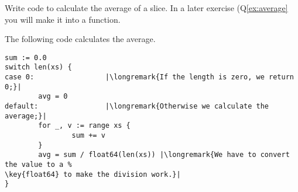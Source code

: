 \begin{Exercise}[title={Average},difficulty=1]
\label{ex:average no func}
\Question\label{ex:average no func q1} Write code
to calculate the average of a  slice. In
a later exercise (Q\ref{ex:average} you will make it into
a function.
\end{Exercise}

\begin{Answer}
\Question The following code calculates the average.
\begin{lstlisting}
sum := 0.0 
switch len(xs) {
case 0:                 |\longremark{If the length is zero, we return 0;}|
        avg = 0
default:                |\longremark{Otherwise we calculate the average;}|
        for _, v := range xs {
                sum += v
        }
        avg = sum / float64(len(xs)) |\longremark{We have to convert the value to a %
\key{float64} to make the division work.}|
}
\end{lstlisting}
\showremarks
\end{Answer}
